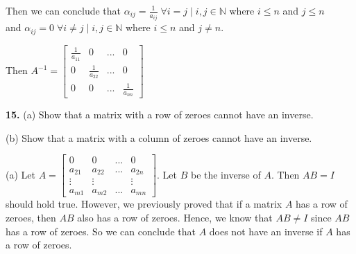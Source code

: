 \documentclass[addpoints]{exam}
\begin{document}
\begin{sloppypar}
\begin{questions}
\begin{solution}
        Then we can conclude that $ \alpha_{ij} = \frac{1}{a_{ij}} \; \forall i = j \; | \; i, j \in \mathbb{N} $ where $ i \leq n $ and $ j \leq n $ \\ and $ \alpha_{ij} = 0 \; \forall i \neq j \; | \; i, j \in \mathbb{N} $ where $ i \leq n $ and $ j \neq n $.

        Then $ A^{-1} = \begin{bmatrix}
            \frac{1}{a_{11}} & 0 & ... & 0 \\ 
            0 & \frac{1}{a_{22}} & ... & 0 \\ 
            0 & 0 & ... &  \frac{1}{a_{nn}}
        \end{bmatrix} $
    \end{solution}
    
    \question
    \textbf{15. } (a) Show that a matrix with a row of zeroes cannot have an inverse. 


    \hspace{7.5mm} (b) Show that a matrix with a column of zeroes cannot have an inverse.
    \begin{solution}
        
        (a) Let $ A = \begin{bmatrix}
            0 & 0 & ... & 0 \\ a_{21} & a_{22} & ... & a_{2n} \\ 
            \vdots & \vdots & & \vdots \\ 
            a_{m1} & a_{m2} & ... & a_{mn}
        \end{bmatrix} $. Let $ B $ be the inverse of $A$. Then $ AB = I $ should hold true. However, we previously proved that if a matrix $ A $ has a row of zeroes, then $ AB $ also has a row of zeroes. Hence, we know that $ AB \neq I $ since $ AB $ has a row of zeroes. So we can conclude that $A$ does not have an inverse if $A$ has a row of zeroes.


\end{solution}
\end{questions}
\end{sloppypar}
\end{document}
